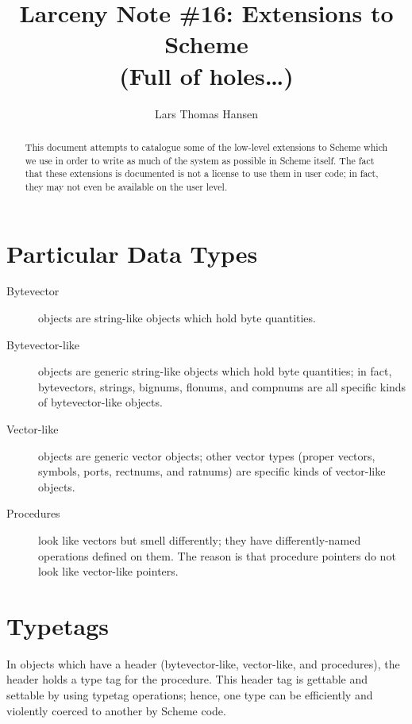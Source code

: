 %


\title{Larceny Note \#16: Extensions to Scheme \\
	{\tenrm (Full of holes\ldots)}}
\author{Lars Thomas Hansen}


\maketitle

\begin{abstract}
This document attempts to catalogue some of the low-level extensions to Scheme
which we use in order to write as much of the system as possible in Scheme
itself. The fact that these extensions is documented is not a license to use
them in user code; in fact, they may not even be available on the user level.
\end{abstract}

\section{Particular Data Types}

\begin{description}

\item[Bytevector] objects are string-like objects which hold byte quantities.

\item[Bytevector-like] objects are generic string-like objects which hold
byte quantities; in fact, bytevectors, strings, bignums, flonums, and
compnums are all specific kinds of bytevector-like objects.

\item[Vector-like] objects are generic vector objects; other vector types
(proper vectors, symbols, ports, rectnums, and ratnums) are specific kinds of
vector-like objects.

\item[Procedures] look like vectors but smell differently; they have
differently-named operations defined on them. The reason is that procedure
pointers do not look like vector-like pointers.

\end{description}


\section{Typetags}

In objects which have a header (bytevector-like, vector-like, and procedures),
the header holds a type tag for the procedure. This header tag is gettable
and settable by using typetag operations; hence, one type can be efficiently
and violently coerced to another by Scheme code.

